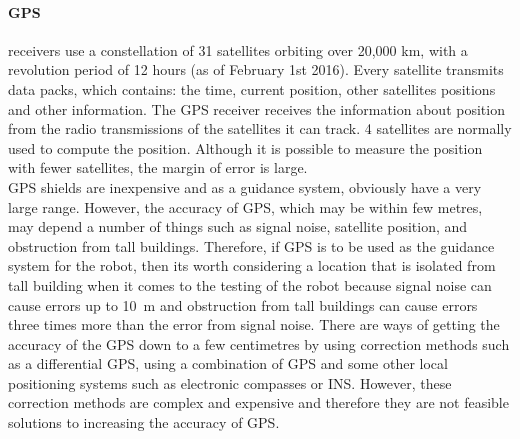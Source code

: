         \paragraph{\gls{GPS}} receivers use a constellation of 31 satellites orbiting over 20,000 km, with a revolution period of 12 hours (as of February 1st 2016). Every satellite transmits data packs, which contains: the time, current position, other satellites positions and other information. The \gls{GPS} receiver receives the information about position from the radio transmissions of the satellites it can track. 4 satellites are normally used to compute the position. Although it is possible to measure the position with fewer satellites, the margin of error is large.\\
        \gls{GPS} \glspl{shield} are inexpensive and as a guidance system, obviously have a very large range.  However, the accuracy of \gls{GPS}, which may be within few metres, may depend a number of things such as signal noise, satellite position, and obstruction from tall buildings. Therefore, if GPS is to be used as the guidance system for the robot, then its worth considering a location that is isolated from tall building when it comes to the testing of the robot because signal noise can cause errors up to \SI{10}{\meter} and obstruction from tall buildings can cause errors three times more than the error from signal noise.\cite{gpsbasics} There are ways of getting the accuracy of the \gls{GPS} down to a few centimetres by using correction methods such as a differential \gls{GPS}, using a combination of \gls{GPS} and some other local positioning systems such as electronic compasses or \gls{INS}. However, these correction methods are complex and expensive and therefore they are not feasible solutions to increasing the accuracy of \gls{GPS}.



